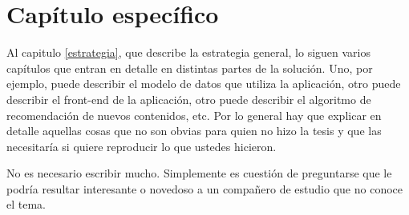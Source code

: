 \chapter{Capítulo específico}

Al capitulo \ref{estrategia}, que describe la estrategia general, lo siguen varios capítulos que entran en detalle en distintas partes de la solución. Uno, por ejemplo, puede describir el modelo de datos que utiliza la aplicación, otro puede describir el front-end de la aplicación, otro puede describir el algoritmo de recomendación de nuevos contenidos, etc. Por lo general hay que explicar en detalle aquellas cosas que no son obvias para quien no hizo la tesis y que las necesitaría si quiere reproducir lo que ustedes hicieron. 

No es necesario escribir mucho. Simplemente es cuestión de preguntarse que le podría resultar interesante o novedoso a
un compañero de estudio que no conoce el tema. 

